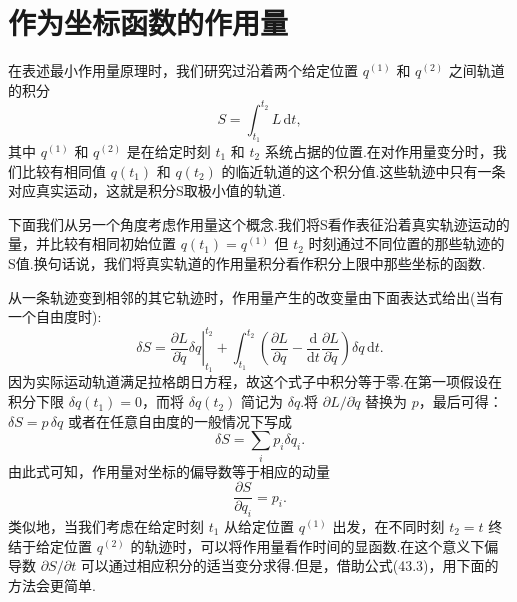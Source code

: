 \section{作为坐标函数的作用量}

在表述最小作用量原理时，我们研究过沿着两个给定位置 $q^{(1)}$ 和 $q^{(2)}$
之间轨道的积分
\begin{equation}
  S=\int_{t_1}^{t_2}L\,\mathrm{d}t,
\end{equation}
其中 $q^{(1)}$ 和 $q^{(2)}$
是在给定时刻 $t_1$ 和 $t_2$
系统占据的位置.在对作用量变分时，我们比较有相同值 $q(t_1)$ 和 $q(t_2)$
的临近轨道的这个积分值.这些轨迹中只有一条对应真实运动，这就是积分S取极小值的轨道.

下面我们从另一个角度考虑作用量这个概念.我们将S看作表征沿着真实轨迹运动的量，并比较有相同初始位置
$q(t_1)=q^{(1)}$ 但 $t_2$
时刻通过不同位置的那些轨迹的S值.换句话说，我们将真实轨道的作用量积分看作积分上限中那些坐标的函数.

从一条轨迹变到相邻的其它轨迹时，作用量产生的改变量由下面表达式给出(当有一个自由度时):
\begin{equation*}
  \delta S=\left.\frac{\partial L}{\partial\dot{q}}\delta q\right|_{t_1}^{t_2}
  +\int_{t_1}^{t_2}\left(\frac{\partial L}{\partial q}
  -\frac{\mathrm{d}}{\mathrm{d}t}\frac{\partial L}{\partial\dot{q}}\right)
  \delta q\,\mathrm{d}t.
\end{equation*}
因为实际运动轨道满足拉格朗日方程，故这个式子中积分等于零.在第一项假设在积分下限
$\delta q(t_1)=0$，而将 $\delta q(t_2)$ 简记为 $\delta q$.将
$\partial L/\partial\dot{q}$ 替换为 $p$，最后可得：$\delta S=p\,\delta q$
或者在任意自由度的一般情况下写成
\begin{equation}
  \delta S=\sum_i p_i\delta q_i.
\end{equation}
由此式可知，作用量对坐标的偏导数等于相应的动量
\begin{equation}
  \frac{\partial S}{\partial q_i}=p_i.
\end{equation}
类似地，当我们考虑在给定时刻 $t_1$ 从给定位置 $q^{(1)}$
出发，在不同时刻 $t_2=t$ 终结于给定位置 $q^{(2)}$
的轨迹时，可以将作用量看作时间的显函数.在这个意义下偏导数
$\partial S/\partial t$
可以通过相应积分的适当变分求得.但是，借助公式(43.3)，用下面的方法会更简单.

